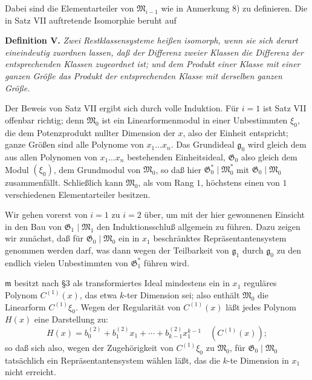 \documentclass[11pt]{article}
\providecommand{\Gmod}{\mathfrak G}
\providecommand{\Mmod}{\mathfrak M}
\providecommand{\mideal}{\mathfrak m}
\providecommand{\gideal}{\mathfrak g}
\begin{document}
Dabei sind die Elementarteiler von $\Mmod_{i-1}$ wie in Anmerkung 8) zu definieren. Die in Satz VII auftretende Isomorphie beruht auf

\medskip
\noindent\textbf{Definition V.} \emph{Zwei Restklassensysteme heißen isomorph, wenn sie sich derart eineindeutig zuordnen lassen, daß der Differenz zweier Klassen die Differenz der entsprechenden Klassen zugeordnet ist; und dem Produkt einer Klasse mit einer ganzen Größe das Produkt der entsprechenden Klasse mit derselben ganzen Größe.}

Der Beweis von Satz VII ergibt sich durch volle Induktion. Für $i=1$ ist Satz VII offenbar richtig; denn $\Mmod_0$ ist ein Linearformenmodul in einer Unbestimmten $\xi_0$, die dem Potenzprodukt nullter Dimension der $x$, also der Einheit entspricht; ganze Größen sind alle Polynome von $x_1\ldots x_n$. Das Grundideal $\gideal_0$ wird gleich dem aus allen Polynomen von $x_1\ldots x_n$ bestehenden Einheitsideal, $\Gmod_0$ also gleich dem Modul $(\xi_0)$, dem Grundmodul von $\Mmod_0$, so daß hier $\Gmod^*_0\mid\Mmod^*_0$ mit $\Gmod_0\mid\Mmod_0$ zusammenfällt. Schließlich kann $\Mmod_0$, als vom Rang $1$, höchstens einen von $1$ verschiedenen Elementarteiler besitzen.

Wir gehen vorerst von $i=1$ zu $i=2$ über, um mit der hier gewonnenen Einsicht in den Bau von $\Gmod_1\mid\Mmod_1$ den Induktionsschluß allgemein zu führen. Dazu zeigen wir zunächst, daß für $\Gmod_0\mid\Mmod_0$ ein in $x_1$ beschränktes Repräsentantensystem genommen werden darf, was dann wegen der Teilbarkeit von $\gideal_1$ durch $\gideal_0$ zu den endlich vielen Unbestimmten von $\Gmod^*_1$ führen wird.

$\mideal$ besitzt nach \S 3 als transformiertes Ideal mindestens ein in $x_1$ reguläres Polynom $C^{(1)}(x)$, das etwa $k$-ter Dimension sei; also enthält $\Mmod_0$ die Linearform $C^{(1)}\xi_0$. Wegen der Regularität von $C^{(1)}(x)$ läßt jedes Polynom $H(x)$ eine Darstellung zu:
\begin{equation}
 H(x)=b^{(2)}_0+b^{(2)}_1x_1+\cdots+b^{(2)}_{k-1}x_1^{k-1}\quad (C^{(1)}(x));
\tag{21}
\end{equation}
so daß sich also, wegen der Zugehörigkeit von $C^{(1)}\xi_0$ zu $\Mmod_0$, für $\Gmod_0\mid\Mmod_0$ tatsächlich ein Repräsentantensystem wählen läßt, das die $k$-te Dimension in $x_1$ nicht erreicht.
\end{document}
